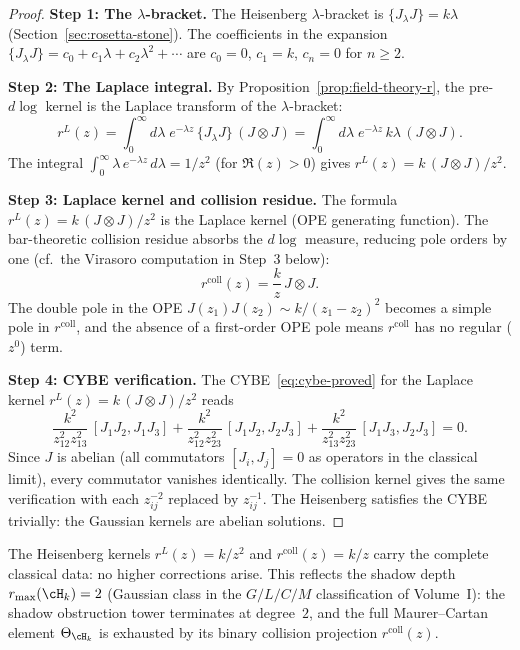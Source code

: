 \begin{proof}
\noindent\textbf{Step 1: The $\lambda$-bracket.}
The Heisenberg $\lambda$-bracket is
$\{J {}_\lambda J\} = k\lambda$
(Section~\ref{sec:rosetta-stone}). The coefficients in the
expansion $\{J {}_\lambda J\} = c_0 + c_1 \lambda + c_2 \lambda^2
+ \cdots$ are $c_0 = 0$, $c_1 = k$, $c_n = 0$ for $n \ge 2$.

\medskip
\noindent\textbf{Step 2: The Laplace integral.}
By Proposition~\ref{prop:field-theory-r}, the pre-\textup{\(d\log\)}
kernel is the Laplace transform of the $\lambda$-bracket:
\[
r^L(z) = \int_0^\infty d\lambda\; e^{-\lambda z}\,
\{J {}_\lambda J\}\, (J \otimes J)
= \int_0^\infty d\lambda\; e^{-\lambda z}\, k\lambda
\, (J \otimes J).
\]
The integral $\int_0^\infty \lambda\, e^{-\lambda z}\, d\lambda
= 1/z^2$ (for $\Re(z) > 0$) gives
$r^L(z) = k\, (J \otimes J)/z^2$.

\medskip
\noindent\textbf{Step 3: Laplace kernel and collision residue.}
The formula $r^L(z) = k\, (J \otimes J)/z^2$ is the Laplace
kernel (OPE generating function). The bar-theoretic collision
residue absorbs the $d\log$ measure, reducing pole orders by
one (cf.\ the Virasoro computation in Step~3 below):
\[
r^{\mathrm{coll}}(z) = \frac{k}{z}\, J \otimes J.
\]
The double pole in the OPE $J(z_1) J(z_2) \sim k/(z_1 - z_2)^2$
becomes a simple pole in $r^{\mathrm{coll}}$, and the absence
of a first-order OPE pole means $r^{\mathrm{coll}}$ has no
regular ($z^0$) term.

\medskip
\noindent\textbf{Step 4: CYBE verification.}
The CYBE~\eqref{eq:cybe-proved} for the Laplace kernel
$r^L(z) = k\, (J \otimes J)/z^2$
reads
\[
\frac{k^2}{z_{12}^2 z_{13}^2}\, [J_1 J_2, J_1 J_3]
+ \frac{k^2}{z_{12}^2 z_{23}^2}\, [J_1 J_2, J_2 J_3]
+ \frac{k^2}{z_{13}^2 z_{23}^2}\, [J_1 J_3, J_2 J_3] = 0.
\]
Since $J$ is abelian (all commutators $[J_i, J_j] = 0$ as
operators in the classical limit), every commutator vanishes
identically. The collision kernel gives the same verification with
each $z_{ij}^{-2}$ replaced by $z_{ij}^{-1}$. The Heisenberg satisfies
the CYBE trivially: the Gaussian kernels are abelian solutions.
\end{proof}

\begin{remark}
The Heisenberg kernels $r^L(z)=k/z^2$ and
$r^{\mathrm{coll}}(z)=k/z$ carry the complete classical data: no higher
corrections arise. This reflects the shadow depth
$r_{\max}(\cH_k) = 2$ (Gaussian class in the $G/L/C/M$
classification of Volume~I): the shadow obstruction tower terminates at degree~$2$,
and the full Maurer--Cartan element $\Theta_{\cH_k}$ is exhausted
by its binary collision projection $r^{\mathrm{coll}}(z)$.
\end{remark}

